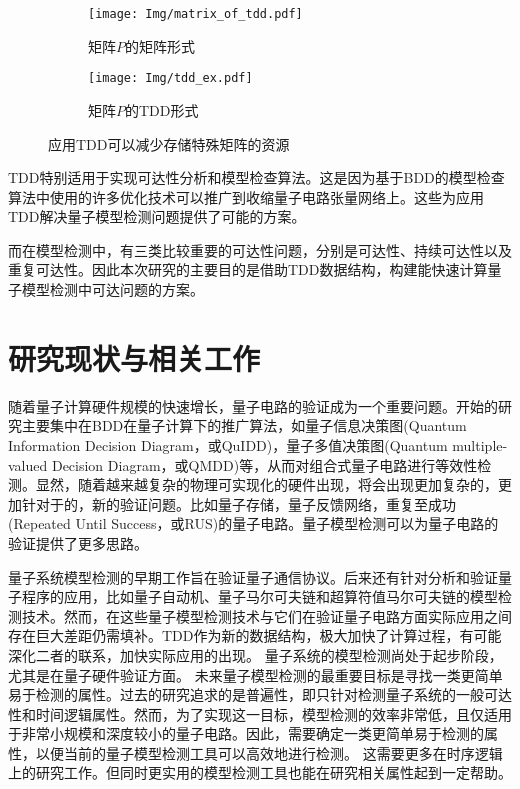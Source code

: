 \begin{figure}[!htbp]
    \begin{subfigure}[c]{0.4\textwidth}
        \centering
        \texttt{[image: Img/matrix\_of\_tdd.pdf]}
        \caption{矩阵$P$的矩阵形式}
        \label{fig:mat_P}
    \end{subfigure}
    \begin{subfigure}[c]{0.4\textwidth}
        \centering
        \texttt{[image: Img/tdd\_ex.pdf]}
        \caption{矩阵$P$的TDD形式}
        \label{fig:tdd_P}
    \end{subfigure}
    \caption{应用TDD可以减少存储特殊矩阵的资源}
    \label{fig:P}
\end{figure}

TDD特别适用于实现可达性分析和模型检查算法。这是因为基于BDD的模型检查算法中使用的许多优化技术可以推广到收缩量子电路张量网络上\citep{Chaki_2018}。这些为应用TDD解决量子模型检测问题提供了可能的方案。


而在模型检测中，有三类比较重要的可达性问题，分别是可达性、持续可达性以及重复可达性。因此本次研究的主要目的是借助TDD数据结构，构建能快速计算量子模型检测中可达问题的方案。

\section{研究现状与相关工作}

随着量子计算硬件规模的快速增长，量子电路的验证成为一个重要问题。开始的研究主要集中在BDD在量子计算下的推广算法，如量子信息决策图(Quantum Information Decision Diagram，或QuIDD)\citep{Viamontes_2003}，量子多值决策图(Quantum multiple-valued Decision Diagram，或QMDD)\citep{Seiter_2013}等，从而对组合式量子电路进行等效性检测。显然，随着越来越复杂的物理可实现化的硬件出现，将会出现更加复杂的，更加针对于的，新的验证问题。比如量子存储\citep{Kerckhoff_2010}，量子反馈网络\citep{Gough_2008}，重复至成功(Repeated Until Success，或RUS)的量子电路\citep{Bocharov_2015}。量子模型检测可以为量子电路的验证提供了更多思路。

量子系统模型检测的早期工作旨在验证量子通信协议\citep{Gay,BALTAZAR_2008,davidson2012model}。后来还有针对分析和验证量子程序的应用\citep{ying2016foundations}，比如量子自动机\citep{ying2014model}、量子马尔可夫链\citep{Ying_2013}和超算符值马尔可夫链\citep{feng2013model}的模型检测技术。然而，在这些量子模型检测技术与它们在验证量子电路方面实际应用之间存在巨大差距仍需填补。TDD作为新的数据结构，极大加快了计算过程，有可能深化二者的联系，加快实际应用的出现。
量子系统的模型检测尚处于起步阶段，尤其是在量子硬件验证方面。
未来量子模型检测的最重要目标是寻找一类更简单易于检测的属性。过去的研究追求的是普遍性，即只针对检测量子系统的一般可达性和时间逻辑属性。然而，为了实现这一目标，模型检测的效率非常低，且仅适用于非常小规模和深度较小的量子电路。因此，需要确定一类更简单易于检测的属性，以便当前的量子模型检测工具可以高效地进行检测\citep{ying2021model}。
这需要更多在时序逻辑上的研究工作。但同时更实用的模型检测工具也能在研究相关属性起到一定帮助。
